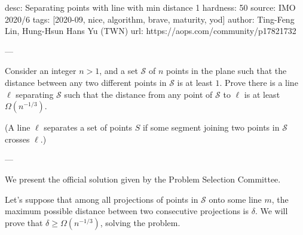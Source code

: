desc: Separating points with line with min distance 1
hardness: 50
source: IMO 2020/6
tags: [2020-09, nice, algorithm, brave, maturity, yod]
author: Ting-Feng Lin, Hung-Hsun Hans Yu (TWN)
url: https://aops.com/community/p17821732

---

Consider an integer $n > 1$, and a set $\mathcal S$ of $n$ points
in the plane such that the distance between any two different points
in $\mathcal S$ is at least $1$.
Prove there is a line $\ell$ separating $\mathcal S$
such that the distance from any point of $\mathcal S$ to $\ell$
is at least $\Omega(n^{-1/3})$.

(A line $\ell$ separates a set of points $S$
if some segment joining two points in $\mathcal S$ crosses $\ell$.)

---

We present the official solution given by the Problem Selection Committee.

Let's suppose that among all projections
of points in $\mathcal S$ onto some line $m$,
the maximum possible distance between two consecutive projections is $\delta$.
We will prove that $\delta \ge \Omega(n^{-1/3})$,
solving the problem.

